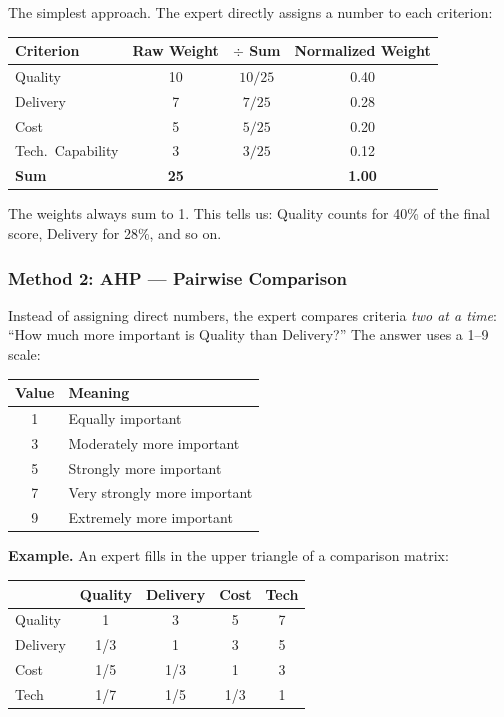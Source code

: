 \documentclass[11pt]{article}
\begin{document}
The simplest approach. The expert directly assigns a number to each criterion:

\begin{center}
\begin{tabular}{lccc}
\toprule
Criterion & Raw Weight & $\div$ Sum & Normalized Weight \\
\midrule
Quality & 10 & $10/25$ & 0.40 \\
Delivery & 7 & $7/25$ & 0.28 \\
Cost & 5 & $5/25$ & 0.20 \\
Tech.\ Capability & 3 & $3/25$ & 0.12 \\
\midrule
\textbf{Sum} & \textbf{25} & & \textbf{1.00} \\
\bottomrule
\end{tabular}
\end{center}

The weights always sum to 1. This tells us: Quality counts for 40\% of the final score, Delivery for 28\%, and so on.

\subsubsection{Method 2: AHP --- Pairwise Comparison}

Instead of assigning direct numbers, the expert compares criteria \textit{two at a time}: ``How much more important is Quality than Delivery?'' The answer uses a 1--9 scale:

\begin{center}
\small
\begin{tabular}{cl}
\toprule
\textbf{Value} & \textbf{Meaning} \\
\midrule
1 & Equally important \\
3 & Moderately more important \\
5 & Strongly more important \\
7 & Very strongly more important \\
9 & Extremely more important \\
\bottomrule
\end{tabular}
\end{center}

\textbf{Example.} An expert fills in the upper triangle of a comparison matrix:

\begin{center}
\begin{tabular}{lcccc}
\toprule
 & Quality & Delivery & Cost & Tech \\
\midrule
Quality & 1 & 3 & 5 & 7 \\
Delivery & 1/3 & 1 & 3 & 5 \\
Cost & 1/5 & 1/3 & 1 & 3 \\
Tech & 1/7 & 1/5 & 1/3 & 1 \\
\bottomrule
\end{tabular}
\end{center}
\end{document}
